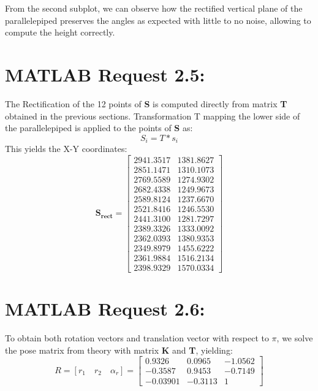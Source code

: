 \documentclass{Configuration_Files/PoliMi3i_thesis}
\begin{document}
From the second subplot, we can observe how the rectified vertical plane of the parallelepiped preserves the angles as expected with little to no noise, allowing to compute the height correctly.


\newpage
\section{MATLAB Request 2.5: }
The Rectification of the 12 points of \textbf{S} is computed directly from matrix \textbf{T} obtained in the previous sections.
Transformation T mapping the lower side of the parallelepiped is applied to the points of \textbf{S} as:
\[
S_{i} = T * s_{i}
\]
This yields the X-Y coordinates:
\[
\mathbf{S_{rect}} = \begin{bmatrix}
2941.3517 & 1381.8627 \\
2851.1471 & 1310.1073 \\
2769.5589 & 1274.9302 \\
2682.4338 & 1249.9673 \\
2589.8124 & 1237.6670 \\
2521.8416 & 1246.5530 \\
2441.3100 & 1281.7297 \\
2389.3326 & 1333.0092 \\
2362.0393 & 1380.9353 \\
2349.8979 & 1455.6222 \\
2361.9884 & 1516.2134 \\
2398.9329 & 1570.0334
\end{bmatrix}
\]

\section{MATLAB Request 2.6: }
To obtain both rotation vectors and translation vector with respect to $\pi$, we solve the pose matrix from theory with matrix \textbf{K} and \textbf{T}, yielding:
\[
R = \left[ r_1 \quad r_2 \quad \alpha_r \right] = 
\begin{bmatrix}
0.9326 & 0.0965 & -1.0562 \\
-0.3587 & 0.9453 & -0.7149 \\
-0.03901 & -0.3113 & 1
\end{bmatrix}
\]
\end{document}
